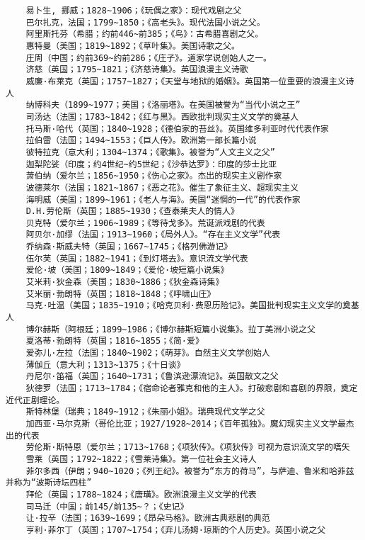 \documentclass[UTF8]{../RepresentationUniverse}
\begin{document}
\begin{lstlisting}
    易卜生, 挪威；1828~1906；《玩偶之家》：现代戏剧之父
    巴尔扎克，法国；1799~1850；《高老头》。现代法国小说之父。
    阿里斯托芬（希腊；约前446~前385；《鸟》：古希腊喜剧之父。
    惠特曼（美国；1819~1892；《草叶集》。美国诗歌之父。
    庄周（中国；约前369~约前286；《庄子》。道家学说创始人之一。
    济慈（英国；1795~1821；《济慈诗集》。英国浪漫主义诗歌
    威廉·布莱克（英国；1757~1827；《天堂与地狱的婚姻》。英国第一位重要的浪漫主义诗人
    纳博科夫（1899~1977；美国；《洛丽塔》。在美国被誉为“当代小说之王”
    司汤达（法国；1783~1842；《红与黑》。西欧批判现实主义文学的奠基人
    托马斯·哈代（英国；1840~1928；《德伯家的苔丝》。英国维多利亚时代代表作家
    拉伯雷（法国；1494~1553；《巨人传》。欧洲第一部长篇小说
    彼特拉克（意大利；1304~1374；《歌集》。被誉为“人文主义之父”
    迦梨陀娑（印度；约4世纪~约5世纪；《沙恭达罗》：印度的莎士比亚
    萧伯纳（爱尔兰；1856~1950；《伤心之家》。杰出的现实主义剧作家
    波德莱尔（法国；1821~1867；《恶之花》。催生了象征主义、超现实主义
    海明威（美国；1899~1961；《老人与海》。美国“迷惘的一代”的代表作家
    D.H.劳伦斯（英国；1885~1930；《查泰莱夫人的情人》
    贝克特（爱尔兰；1906~1989；《等待戈多》。荒诞派戏剧的代表
    阿贝尔·加缪（法国；1913~1960；《局外人》。“存在主义文学”代表
    乔纳森·斯威夫特（英国；1667~1745；《格列佛游记》
    伍尔芙（英国；1882~1941；《到灯塔去》。意识流文学代表
    爱伦·坡（美国；1809~1849；《爱伦·坡短篇小说集》
    艾米莉·狄金森（美国；1830~1886；《狄金森诗集》
    艾米丽·勃朗特（英国；1818~1848；《呼啸山庄》
    马克·吐温（美国；1835~1910；《哈克贝利·费恩历险记》。美国批判现实主义文学的奠基人
    博尔赫斯（阿根廷；1899~1986；《博尔赫斯短篇小说集》。拉丁美洲小说之父
    夏洛蒂·勃朗特（英国；1816~1855；《简·爱》
    爱弥儿·左拉（法国；1840~1902；《萌芽》。自然主义文学创始人
    薄伽丘（意大利；1313~1375；《十日谈》
    丹尼尔·笛福（英国；1640~1731；《鲁滨逊漂流记》。英国散文之父
    狄德罗（法国；1713~1784；《宿命论者雅克和他的主人》。打破悲剧和喜剧的界限，奠定近代正剧理论。
    斯特林堡（瑞典；1849~1912；《朱丽小姐》。瑞典现代文学之父
    加西亚·马尔克斯（哥伦比亚；1927/1928~2014；《百年孤独》。魔幻现实主义文学最杰出的代表
    劳伦斯·斯特恩（爱尔兰；1713~1768；《项狄传》。《项狄传》可视为意识流文学的嚆矢
    雪莱（英国；1792~1822；《雪莱诗集》。第一位社会主义诗人
    菲尔多西（伊朗；940~1020；《列王纪》。被誉为“东方的荷马”，与萨迪、鲁米和哈菲兹并称为“波斯诗坛四柱”
    拜伦（英国；1788~1824；《唐璜》。欧洲浪漫主义文学的代表
    司马迁（中国；前145/前135~？；《史记》
    让·拉辛（法国；1639~1699；《昂朵马格》。欧洲古典悲剧的典范
    亨利·菲尔丁（英国；1707~1754；《弃儿汤姆·琼斯的个人历史》。英国小说之父

\end{lstlisting}
\end{document}
